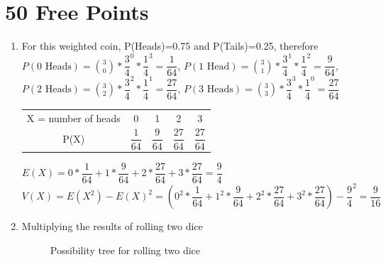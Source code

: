 \documentclass{article}
\author{Nathan Stouffer}
\begin{document}
\section*{50 Free Points}

\clearpage
\header

\begin{enumerate}[2.1]
	\item For this weighted coin, P(Heads)=0.75 and P(Tails)=0.25, therefore $P(\text{0 Heads})= \binom{3}{0}*\dfrac{3}{4}^0*\dfrac{1}{4}^3= \dfrac{1}{64}$, $P(\text{1 Head})= \binom{3}{1}*\dfrac{3}{4}^1*\dfrac{1}{4}^2= \dfrac{9}{64}$, $P(\text{2 Heads})= \binom{3}{2}*\dfrac{3}{4}^2*\dfrac{1}{4}^1= \dfrac{27}{64}$, $P(\text{3 Heads})= \binom{3}{3}*\dfrac{3}{4}^3*\dfrac{1}{4}^0= \dfrac{27}{64}$
	\begin{center}
		\begin{tabular}{ |c|c|c|c|c| } 
			\hline
			X = number of heads & 0 & 1 & 2 & 3 \\ 
			P(X) & $\dfrac{1}{64}$ & $\dfrac{9}{64}$ & $\dfrac{27}{64}$ & $\dfrac{27}{64}$ \\ 
			\hline
		\end{tabular}
	\end{center}
	$E(X)=0*\dfrac{1}{64} + 1*\dfrac{9}{64} + 2*\dfrac{27}{64} + 3*\dfrac{27}{64}=\dfrac{9}{4}$ \\
	$V(X)= E(X^2) - E(X)^2 = (0^2*\dfrac{1}{64} + 1^2*\dfrac{9}{64} + 2^2*\dfrac{27}{64} + 3^2*\dfrac{27}{64}) - \dfrac{9}{4}^2 = \dfrac{9}{16}$
	\item Multiplying the results of rolling two dice
		\graphicspath{ {possibility_tree} }
		\begin{figure}[h]
			\centering
			\caption{Possibility tree for rolling two dice}
		\end{figure}
		\begin{center}

\end{center}
\end{enumerate}
\end{document}
